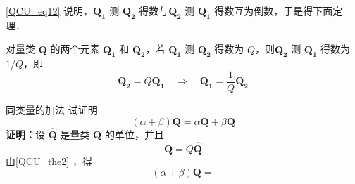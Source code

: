 \autoref{QCU_eq12} 说明，$\boldsymbol{Q_1}$ 测 $\boldsymbol{Q_2}$ 得数与$\boldsymbol{Q_2}$ 测 $\boldsymbol{Q_1}$ 得数互为倒数，于是得下面定理．
\begin{theorem}{}
对量类 $\widetilde{\boldsymbol{Q}}$ 的两个元素 $\boldsymbol{Q_1}$ 和 $\boldsymbol{Q_2}$，若 $\boldsymbol{Q_1}$ 测 $\boldsymbol{Q_2}$ 得数为 $Q$，则$\boldsymbol{Q_2}$ 测 $\boldsymbol{Q_1}$ 得数为 $1/Q$，即
\begin{equation}
\boldsymbol{Q_2}=Q\boldsymbol{Q_1}\quad\Rightarrow\quad\boldsymbol{Q_1}=\frac{1}{Q}\boldsymbol{Q_2}
\end{equation}
\end{theorem}
\begin{example}{同类量的加法}
试证明
\begin{equation}
(\alpha +\beta)\boldsymbol{Q}=\alpha\boldsymbol{Q} +\beta\boldsymbol{Q}
\end{equation}
\textbf{证明：}设 $\hat{\boldsymbol{Q}}$ 是量类 $\tilde{\boldsymbol{Q}}$ 的单位，并且
\begin{equation}
\boldsymbol{Q}=Q\hat{\boldsymbol{Q}}
\end{equation}
由\autoref{QCU_the2} ，得
\begin{equation}
(\alpha+\beta)\boldsymbol{Q}=
\end{equation}

\end{example}